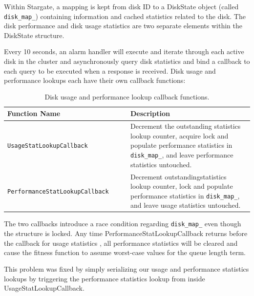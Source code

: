 \documentclass[12pt]{article}
\begin{document}
\begin{appendices}
  Within Stargate, a mapping is kept from disk ID to a DiskState object (called
  \texttt{disk\_map\_}) containing information and cached statistics related to
  the disk. The disk performance and disk usage statistics are two separate
  elements within the DiskState structure.

  Every 10 seconds, an alarm handler will execute and iterate through each
  active disk in the cluster and asynchronously query disk statistics and bind a
  callback to each query to be executed when a response is received. Disk usage
  and performance lookups each have their own callback functions:

  \begin{table}[htbp]
    \caption{Disk usage and performance lookup callback functions.}
    \begin{center}
    \begin{tabular}{ | p{0.5\linewidth} | p{0.5\linewidth} | }
      \hline
      \textbf{Function Name} & \textbf{Description} \\ \hline
      \verb|UsageStatLookupCallback| & Decrement the outstanding statistics lookup
                                       counter, acquire lock and populate
                                       performance statistics in
                                       \texttt{disk\_map\_}, and leave
                                       performance statistics untouched.
                                       \\ \hline

      \verb|PerformanceStatLookupCallback| & Decrement outstandingstatistics 
                                             lookup counter, lock and
                                             populate performance statistics in
                                             \texttt{disk\_map\_}, and leave
                                             usage statistics untouched. \\ \hline

      \hline
    \end{tabular}
    \end{center}
  \end{table}

  The two callbacks introduce a race condition regarding \texttt{disk\_map\_}
  even though the structure is locked. Any time PerformanceStatLookupCallback
  returns before the callback for usage statistics , all performance statistics
  will be cleared and cause the fitness function to assume worst-case values
  for the queue length term.

  This problem was fixed by simply serializing our usage and performance
  statistics lookups by triggering the performance statistics lookup from
  inside UsageStatLookupCallback.

\end{appendices}
\end{document}

